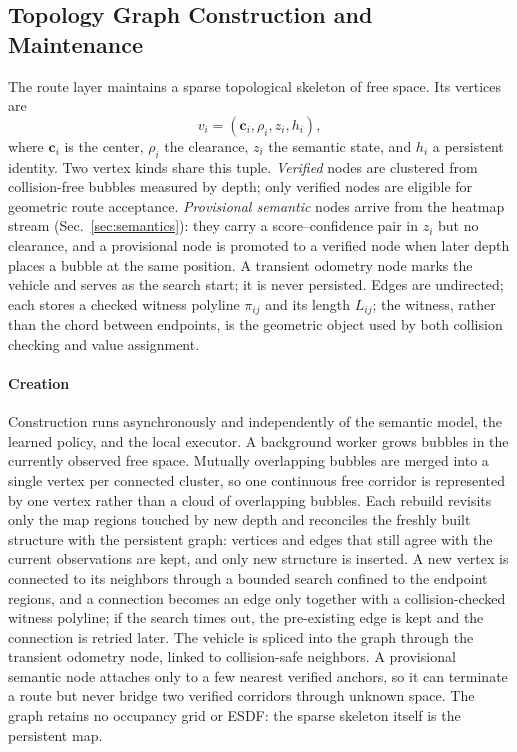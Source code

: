 \documentclass[letterpaper,10pt,conference]{ieeeconf}
\newcommand{\vect}[1]{\boldsymbol{#1}}
\begin{document}
\subsection{Topology Graph Construction and Maintenance}
\label{sec:topology}
The route layer maintains a sparse topological skeleton of free space.
Its vertices are
\begin{equation}
 v_i=(\vect{c}_i,\rho_i,z_i,h_i),
\end{equation}
where $\vect{c}_i$ is the center, $\rho_i$ the clearance, $z_i$ the semantic
state, and $h_i$ a persistent identity.  Two vertex kinds share this tuple.
\emph{Verified} nodes are clustered from collision-free bubbles measured by
depth; only verified nodes are eligible for geometric route acceptance.
\emph{Provisional semantic} nodes arrive from the heatmap stream
(Sec.~\ref{sec:semantics}): they carry a score--confidence pair in $z_i$
but no clearance, and a provisional node is promoted to a verified node
when later depth places a bubble at the same position.  A transient
odometry node marks the vehicle and serves as the search start; it is
never persisted.  Edges are undirected; each stores a checked witness
polyline $\pi_{ij}$ and its length $L_{ij}$; the witness, rather than the
chord between endpoints, is the geometric object used by both collision
checking and value assignment.

\paragraph{Creation}
Construction runs asynchronously and independently of the semantic model,
the learned policy, and the local executor.  A background worker grows
bubbles in the currently observed free space.  Mutually overlapping
bubbles are merged into a single vertex per connected cluster, so one
continuous free corridor is represented by one vertex rather than a
cloud of overlapping bubbles.  Each rebuild revisits only the map
regions touched by new depth and reconciles the freshly built structure
with the persistent graph: vertices and edges that still agree with the
current observations are kept, and only new structure is
inserted.  A new vertex is
connected to its neighbors through a bounded search confined to the
endpoint regions, and a connection becomes an edge only
together with a collision-checked witness polyline; if the search times
out, the pre-existing edge is kept and the connection is retried later.
The vehicle is spliced into the graph through the transient odometry
node, linked to collision-safe neighbors.  A provisional semantic node
attaches only to a few nearest verified anchors, so it can terminate a
route but never bridge two verified
corridors through unknown space.  The graph retains no occupancy grid or
ESDF: the sparse skeleton itself is the persistent map.
\end{document}
